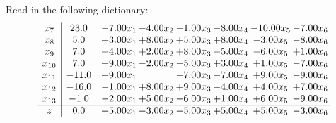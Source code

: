 \documentclass[9pt]{article}
\begin{document}
Read in the following dictionary:
\[\begin{array}{c| c c@{\hskip 2pt} c@{\hskip 2pt} c@{\hskip 2pt} c@{\hskip 2pt} c@{\hskip 2pt} c@{\hskip 2pt} }
 x_{7}   &  23.0 & -7.00 x_{1} & -4.00 x_{2} & -1.00 x_{3} & -8.00 x_{4} & -10.00 x_{5} & -7.00 x_{6}\\
 x_{8}   &  5.0 & +  3.00 x_{1} & +  8.00 x_{2} & +  5.00 x_{3} & +  8.00 x_{4} & -3.00 x_{5} & -8.00 x_{6}\\
 x_{9}   &  7.0 & +  4.00 x_{1} & +  2.00 x_{2} & +  8.00 x_{3} & -5.00 x_{4} & -6.00 x_{5} & +  1.00 x_{6}\\
 x_{10}   &  7.0 & +  9.00 x_{1} & -2.00 x_{2} & -5.00 x_{3} & +  3.00 x_{4} & +  1.00 x_{5} & -7.00 x_{6}\\
 x_{11}   &  -11.0 & +  9.00 x_{1} &   & -7.00 x_{3} & -7.00 x_{4} & +  9.00 x_{5} & -9.00 x_{6}\\
 x_{12}   &  -16.0 & -1.00 x_{1} & +  8.00 x_{2} & +  9.00 x_{3} & -4.00 x_{4} & +  4.00 x_{5} & +  7.00 x_{6}\\
 x_{13}   &  -1.0 & -2.00 x_{1} & +  5.00 x_{2} & -6.00 x_{3} & +  1.00 x_{4} & +  6.00 x_{5} & -9.00 x_{6}\\
\hline
z    &  0.0 & +  5.00 x_{1} & -3.00 x_{2} & -5.00 x_{3} & +  5.00 x_{4} & +  5.00 x_{5} & -3.00 x_{6}\\
\end{array}\]
\end{document}
